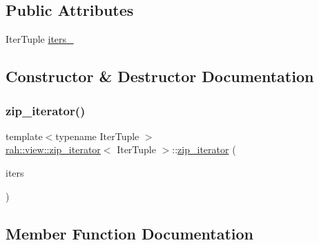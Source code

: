 \subsection*{Public Attributes}
\begin{DoxyCompactItemize}
\item 
Iter\+Tuple \mbox{\hyperlink{structrah_1_1view_1_1zip__iterator_a58f5f6dd935fe51dd3c3a28e3b06ecc9}{iters\+\_\+}}
\end{DoxyCompactItemize}


\subsection{Constructor \& Destructor Documentation}
\mbox{\label{structrah_1_1view_1_1zip__iterator_a2f6b7c790bcb819a68e4828f6bd6ef79}} 
\subsubsection{\texorpdfstring{zip\_iterator()}{zip\_iterator()}}
{\footnotesize\ttfamily template$<$typename Iter\+Tuple $>$ \\
\mbox{\hyperlink{structrah_1_1view_1_1zip__iterator}{rah\+::view\+::zip\+\_\+iterator}}$<$ Iter\+Tuple $>$\+::\mbox{\hyperlink{structrah_1_1view_1_1zip__iterator}{zip\+\_\+iterator}} (\begin{DoxyParamCaption}\item[{Iter\+Tuple const \&}]{iters }\end{DoxyParamCaption})\hspace{0.3cm}{\ttfamily [inline]}}



\subsection{Member Function Documentation}
\mbox{\label{structrah_1_1view_1_1zip__iterator_abc9b6f7ff787d1a08c4a327d738a1809}} 
